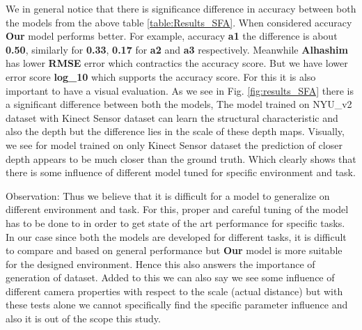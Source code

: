 We in general notice that there is significance difference in accuracy between both the models from the above table \ref{table:Results_SFA}. When considered accuracy \textbf{Our} model performs better. For example, accuracy \textbf{a1} the difference is about \textbf{0.50}, similarly for \textbf{0.33}, \textbf{0.17} for \textbf{a2} and \textbf{a3} respectively. Meanwhile \textbf{Alhashim} has lower \textbf{RMSE} error which contractics the accuracy score. But we have lower error score \textbf{log\_{10}} which supports the accuracy score. For this it is also important to have a visual evaluation. As we see in Fig. \ref{fig:results_SFA} there is a significant difference between both the models, The model trained on NYU\_v2 dataset with Kinect Sensor dataset can learn the structural characteristic and also the depth but the difference lies in the scale of these depth maps. Visually, we see for model trained on only Kinect Sensor dataset the prediction of closer depth appears to be much closer than the ground truth. Which clearly shows that there is some influence of different model tuned for specific environment and task.

Observation: Thus we believe that it is difficult for a model to generalize on different environment and task. For this, proper and careful tuning of the model has to be done to in order to get state of the art performance for specific tasks. In our case since both the models are developed for different tasks, it is difficult to compare and based on general performance but \textbf{Our} model is more suitable for the designed environment. Hence this also answers the importance of generation of dataset. Added to this we can also say we see some influence of different camera properties with respect to the scale (actual distance) but with these tests alone we cannot specifically find the specific parameter influence and also it is out of the scope this study. 



